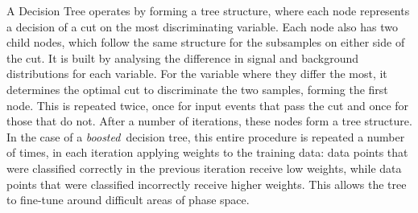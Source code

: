 A Decision Tree operates by forming a tree structure, where each node represents a decision of a cut on the most discriminating variable.
Each node also has two child nodes, which follow the same structure for the subsamples on either side of the cut.
It is built by analysing the difference in signal and background distributions for each variable.
For the variable where they differ the most, it determines the optimal cut to discriminate the two samples, forming the first node.
This is repeated twice, once for input events that pass the cut and once for those that do not.
After a number of iterations, these nodes form a tree structure.
In the case of a \emph{boosted}~decision tree, this entire procedure is repeated a number of times, in each iteration applying weights to the training data: data points that were classified correctly in the previous iteration receive low weights, while data points that were classified incorrectly receive higher weights.
This allows the tree to fine-tune around difficult areas of phase space.

